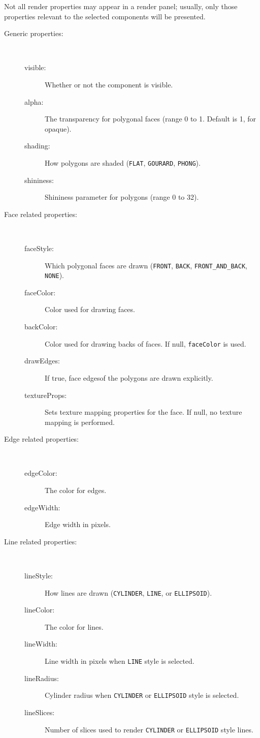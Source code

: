 \documentclass{article}
\begin{document}
Not all render properties may appear in a render panel; usually, only
those properties relevant to the selected components will be
presented.

\begin{description}

\item[Generic properties:]
\hfil \\
\begin{description}
\item[visible:]
Whether or not the component is visible.
\item[alpha:]
The transparency for polygonal faces (range 0 to 1. Default is 1, for
opaque).
\item[shading:]
How polygons are shaded ({\tt FLAT}, {\tt GOURARD}, {\tt PHONG}).
\item[shininess:]
Shininess parameter for polygons (range 0 to 32).
\end{description}

\item[Face related properties:]
\hfil \\
\begin{description}
\item[faceStyle:]
Which polygonal faces are drawn ({\tt FRONT}, {\tt BACK},
{\tt FRONT\_AND\_BACK}, {\tt NONE}).
\item[faceColor:] 
Color used for drawing faces.
\item[backColor:]
Color used for drawing backs of faces. If null, {\tt faceColor} is used.
\item[drawEdges:] 	
If true, face edgesof the polygons are drawn explicitly.
\item[textureProps:] 
Sets texture mapping properties for the face. If null, no texture
mapping is performed.
\end{description}

\item[Edge related properties:]
\hfil \\
\begin{description}
\item[edgeColor:]
The color for edges.
\item[edgeWidth:]
Edge width in pixels.
\end{description}

\item[Line related properties:]
\hfil \\
\begin{description}
\item[lineStyle:] 
How lines are drawn ({\tt CYLINDER}, {\tt LINE}, or {\tt ELLIPSOID}).
\item[lineColor:]
The color for lines.
\item[lineWidth:]
Line width in pixels when {\tt LINE} style is selected.
\item[lineRadius:]
Cylinder radius when {\tt CYLINDER} or {\tt ELLIPSOID} style is selected.
\item[lineSlices:]
Number of slices used to render {\tt CYLINDER} or {\tt ELLIPSOID} style lines.
\end{description}


\end{description}
\end{document}
